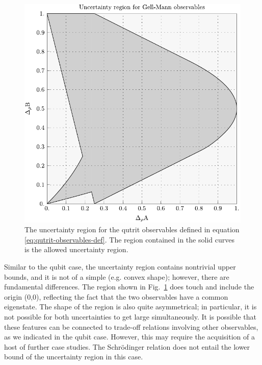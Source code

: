 \begin{figure}[t]\centering
  \includegraphics[width=\textwidth]{figs/full-gellmann-ur-square}
  \caption[The uncertainty region for the qutrit observables defined in equation \eqref{eq:qutrit-observables-def}]{The uncertainty region for the qutrit observables defined in equation \eqref{eq:qutrit-observables-def}. The region contained in the solid curves is the allowed uncertainty region.}
  \label{fig:qutrit-uncertainty-region}
\end{figure}


Similar to the qubit case, the uncertainty region contains nontrivial upper bounds, and it is not of a simple (e.g. convex shape); however, there are fundamental differences. The region shown in Fig.~\ref{fig:qutrit-uncertainty-region} does touch and include the origin (0,0), reflecting the fact that the two observables have a common eigenstate. The shape of the region is also quite asymmetrical; in particular, it is not possible for both uncertainties to get large simultaneously. It is possible that these features can be connected to trade-off relations involving other observables, as we indicated in the qubit case. However, this may require the acquisition of a host of further case studies.
The Schr\"odinger relation does not entail the lower bound of the uncertainty region in this case. 

